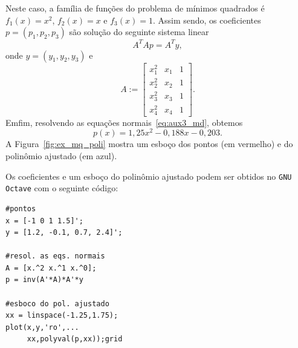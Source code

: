 \begin{ex}
  
  Neste caso, a família de funções do problema de mínimos quadrados é $f_1(x) = x^2$, $f_2(x) = x$ e $f_3(x) = 1$. Assim sendo, os coeficientes $p = (p_1, p_2, p_3)$ são solução do seguinte sistema linear
  \begin{equation}\label{eq:aux3_md}
    A^TAp = A^Ty,
  \end{equation}
  onde $y = (y_1, y_2, y_3)$ e
  \begin{equation}
    A :=
    \begin{bmatrix}
      x_1^2 & x_1 & 1 \\
      x_2^2 & x_2 & 1 \\
      x_3^2 & x_3 & 1 \\
      x_4^2 & x_4 & 1
    \end{bmatrix}.
  \end{equation}
  Emfim, resolvendo as equações normais~\eqref{eq:aux3_md}, obtemos
  \begin{equation}
    p(x) = 1,25x^2 -0,188x - 0,203.
  \end{equation}
  A Figura~\ref{fig:ex_mq_poli} mostra um esboço dos pontos (em vermelho) e do polinômio ajustado (em azul).
  
  \ifisoctave
  Os coeficientes e um esboço do polinômio ajustado podem ser obtidos no \verb+GNU Octave+ com o seguinte código:
\begin{verbatim}
#pontos
x = [-1 0 1 1.5]';
y = [1.2, -0.1, 0.7, 2.4]';

#resol. as eqs. normais
A = [x.^2 x.^1 x.^0];
p = inv(A'*A)*A'*y

#esboco do pol. ajustado
xx = linspace(-1.25,1.75);
plot(x,y,'ro',...
     xx,polyval(p,xx));grid
\end{verbatim}
  \fi
  
\end{ex}


